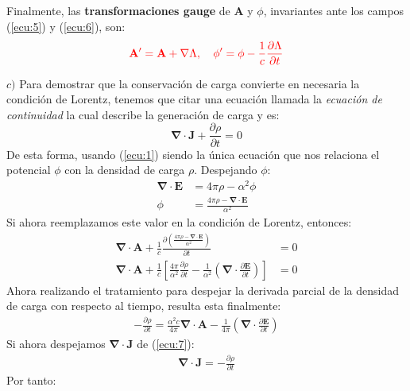 \begin{multicols}{2}
Finalmente, las \textbf{transformaciones gauge} de $\mathbf{A}$ y $\phi$, invariantes ante los campos (\ref{ecu:5}) y (\ref{ecu:6}), son:
\begin{align*}
    \textcolor{rojo}{\mathbf{A}^{\prime} = \mathbf{A} + \mathbf{\nabla} \Lambda,~~~\phi^{\prime} = \phi - \frac{1}{c} \frac{\partial \Lambda}{\partial t}}
\end{align*}

$c)$ Para demostrar que la conservación de carga convierte en necesaria la condición de Lorentz, tenemos que citar una ecuación llamada la \textit{ecuación de continuidad} la cual describe la generación de carga y es:
\begin{equation}
    \mathbf{\nabla} \cdot \mathbf{J} + \frac{\partial \rho}{\partial t} = 0 \label{ecu:7}
\end{equation}
De esta forma, usando (\ref{ecu:1}) siendo la única ecuación que nos relaciona el potencial $\phi$ con la densidad de carga $\rho$. Despejando $\phi$:
\begin{align*}
    \mathbf{\nabla} \cdot \mathbf{E} &= 4\pi \rho - \alpha^{2} \phi\\
    \phi &= \frac{4\pi \rho - \mathbf{\nabla} \cdot \mathbf{E}}{\alpha^{2}}
\end{align*}
Si ahora reemplazamos este valor en la condición de Lorentz, entonces:
\begin{align*}
    \mathbf{\nabla} \cdot \mathbf{A} + \frac{1}{c} \frac{\partial \left(\frac{4\pi \rho - \mathbf{\nabla} \cdot \mathbf{E}}{\alpha^{2}}\right)}{\partial t} &= 0\\
    \mathbf{\nabla} \cdot\mathbf{A} + \frac{1}{c} \left[\frac{4\pi}{\alpha^{2}} \frac{\partial \rho}{\partial t} - \frac{1}{\alpha^{2}}\left(\mathbf{\nabla}\cdot\frac{\partial \mathbf{E}}{\partial t}\right)\right] &= 0
\end{align*}
Ahora realizando el tratamiento para despejar la derivada parcial de la densidad de carga con respecto al tiempo, resulta esta finalmente:
\begin{align*}
    - \frac{\partial \rho}{\partial t} = \frac{\alpha^{2}c}{4\pi} \mathbf{\nabla} \cdot \mathbf{A} - \frac{1}{4\pi} \left(\mathbf{\nabla}\cdot\frac{\partial \mathbf{E}}{\partial t}\right)
\end{align*}
Si ahora despejamos $\mathbf{\nabla} \cdot \mathbf{J}$ de (\ref{ecu:7}):
\begin{align*}
    \mathbf{\nabla} \cdot \mathbf{J} = - \frac{\partial \rho}{\partial t}
\end{align*}
Por tanto:

\end{multicols}
